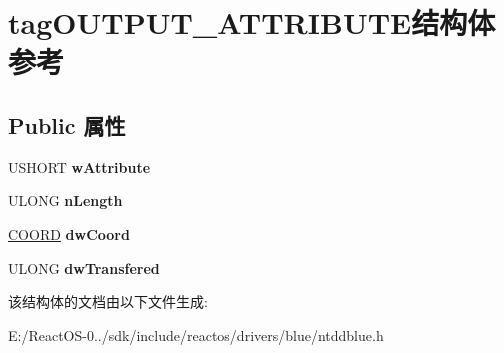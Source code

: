 \hypertarget{structtag_o_u_t_p_u_t___a_t_t_r_i_b_u_t_e}{}\section{tag\+O\+U\+T\+P\+U\+T\+\_\+\+A\+T\+T\+R\+I\+B\+U\+T\+E结构体 参考}
\label{structtag_o_u_t_p_u_t___a_t_t_r_i_b_u_t_e}
\subsection*{Public 属性}
\begin{DoxyCompactItemize}
\item 
\mbox{\label{structtag_o_u_t_p_u_t___a_t_t_r_i_b_u_t_e_ae7fb4623d5624d4117f33c5fdd8bf3ee}} 
U\+S\+H\+O\+RT {\bfseries w\+Attribute}
\item 
\mbox{\label{structtag_o_u_t_p_u_t___a_t_t_r_i_b_u_t_e_a44ff7c4b57abe921be9c565784b07f92}} 
U\+L\+O\+NG {\bfseries n\+Length}
\item 
\mbox{\label{structtag_o_u_t_p_u_t___a_t_t_r_i_b_u_t_e_a6e9251a4c6fe66817b12f75f796a5cda}} 
\hyperlink{struct___c_o_o_r_d}{C\+O\+O\+RD} {\bfseries dw\+Coord}
\item 
\mbox{\label{structtag_o_u_t_p_u_t___a_t_t_r_i_b_u_t_e_a6d6b2f6807b1c25666ac14b95a3874ff}} 
U\+L\+O\+NG {\bfseries dw\+Transfered}
\end{DoxyCompactItemize}


该结构体的文档由以下文件生成\+:\begin{DoxyCompactItemize}
\item 
E\+:/\+React\+O\+S-\/0../sdk/include/reactos/drivers/blue/ntddblue.\+h\end{DoxyCompactItemize}
